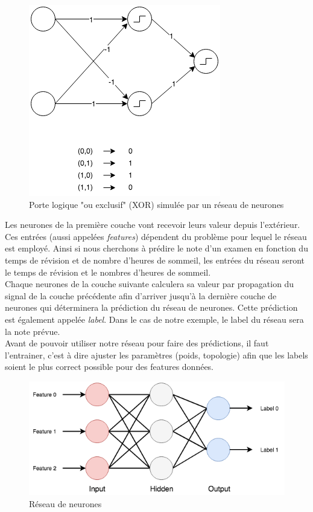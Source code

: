 \documentclass{article}
\begin{document}
\begin{figure}[H]
\begin{center}
	\includegraphics[scale=0.7]{xor.png} 
	\caption{Porte logique "ou exclusif" (XOR) simulée par un réseau de neurones}
\end{center}
\end{figure}

Les neurones de la première couche vont recevoir leurs valeur depuis l'extérieur. Ces entrées (aussi appelées \textit{features}) dépendent du problème pour lequel le réseau est employé. Ainsi si nous cherchons à prédire le note d'un examen en fonction du temps de révision et de nombre d'heures de sommeil, les entrées du réseau seront le temps de révision et le nombres d'heures de sommeil.\\
 Chaque neurones de la couche suivante calculera sa valeur par propagation du signal de la couche précédente afin d'arriver jusqu'à la dernière couche de neurones qui déterminera la prédiction du réseau de neurones. Cette prédiction est également appelée \textit{label}. Dans le cas de notre exemple, le label du réseau sera la note prévue.\\
 Avant de pouvoir utiliser notre réseau pour faire des prédictions, il faut l'entrainer, c'est à dire ajuster les paramètres (poids, topologie) afin que les labels soient le plus correct possible pour des features données.\\
 
\begin{figure}[H]
\begin{center}
	\includegraphics[scale=0.7]{ff.png}
	\caption{Réseau de neurones}
\end{center}
\end{figure}
 
\end{document}
